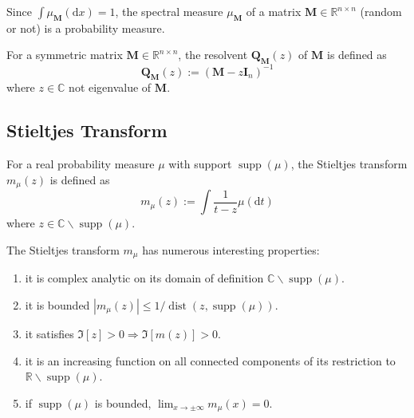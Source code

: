 \begin{remark}
    Since $\int\mu_{\mathbf{M}}\left(\mathrm{d}x\right)=1$, the spectral measure $\mu_{\mathbf{M}}$ of a matrix $\mathbf{M}\in\mathbb{R}^{n\times n}$ (random or not) is a probability measure.
\end{remark}

\begin{definition}[Resolvent]
    For a symmetric matrix $\mathbf{M}\in\mathbb{R}^{n\times n}$, the resolvent $\mathbf{Q}_{\mathbf{M}}(z)$ of $\mathbf{M}$ is defined as
    \begin{equation}
        \mathbf{Q}_{\mathbf{M}}(z):=\left(\mathbf{M}-z\mathbf{I}_{n}\right)^{-1}
    \end{equation}
    where $z\in\mathbb{C}$ not eigenvalue of $\mathbf{M}$.
\end{definition}

\subsection*{Stieltjes Transform}

\begin{definition}
    For a real probability measure $\mu$ with support $\operatorname{supp}(\mu)$, the Stieltjes transform $m_{\mu}(z)$ is defined as
    \begin{equation}
        m_{\mu}(z):=\int\frac{1}{t-z}\mu\left(\mathrm{d}t\right)
    \end{equation}
    where $z\in\mathbb{C}\backslash\operatorname{supp}(\mu)$.
\end{definition}

\begin{property}
    The Stieltjes transform $m_{\mu}$ has numerous interesting properties:
    \begin{enumerate}
        \item it is complex analytic on its domain of definition $\mathbb{C} \backslash \operatorname{supp}(\mu)$.
        \item it is bounded $\left|m_{\mu}(z)\right|\leq 1/\operatorname{dist}(z,\operatorname{supp}(\mu))$.
        \item it satisfies $\Im[z]>0 \Rightarrow \Im[m(z)]>0$.
        \item it is an increasing function on all connected components of its restriction to $\mathbb{R}\backslash\operatorname{supp}(\mu)$. %
        \item if $\operatorname{supp}(\mu)$ is bounded, $\lim_{x\rightarrow\pm\infty}m_{\mu}(x)=0$.
    \end{enumerate}
\end{property}

